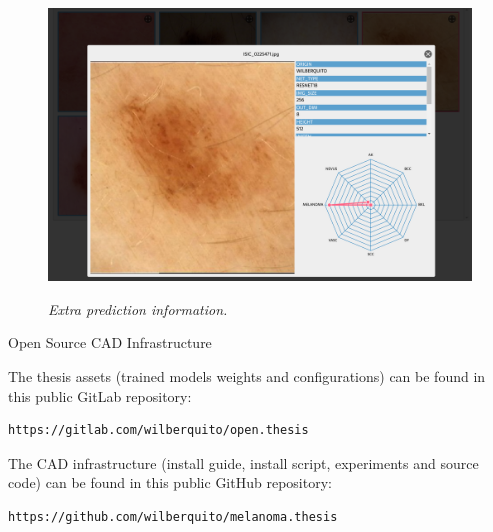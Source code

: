 \documentclass[dvipsnames,mathserif]{beamer}
\begin{document}
{\begin{frame}
      \begin{figure}[H]
        \centering
        \begin{adjustbox}{width=0.8\textwidth, trim={0.05cm 0cm 0.25cm 0cm}, clip}
          \includegraphics[]{images/extra-inf-popup.png}
        \end{adjustbox}
        \caption[Extra prediction information]{\textit{Extra prediction information.}}
        {\label{fig:extra-inf-popup}}
      \end{figure}

    \end{frame}


    \begin{frame}[fragile]


      \large Open Source CAD Infrastructure
      \vspace{0.25cm}

      \footnotesize

      The thesis assets (trained models weights and configurations) can be found in
      this public GitLab repository:

      \vspace{0.1cm}

      \begin{Verbatim}[fontsize=\tiny]
https://gitlab.com/wilberquito/open.thesis
      \end{Verbatim}

      The CAD infrastructure (install guide, install script, experiments and source code) can be found in
      this public GitHub repository:

      \vspace{0.1cm}

      \begin{Verbatim}[fontsize=\tiny]
https://github.com/wilberquito/melanoma.thesis
      \end{Verbatim}


\end{frame}}
\end{document}
